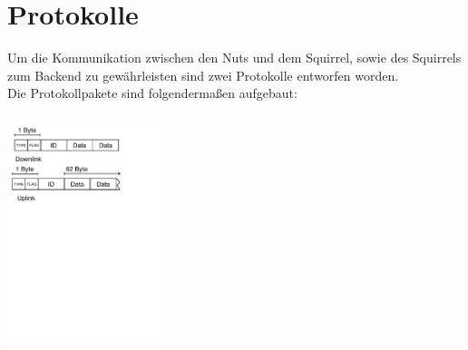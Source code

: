 \documentclass[12pt,a4paper]{article}
\begin{document}
\section{Protokolle}
Um die Kommunikation zwischen den Nuts und dem Squirrel, sowie des Squirrels zum Backend zu gewährleisten sind zwei Protokolle entworfen worden.\\
Die Protokollpakete sind folgendermaßen aufgebaut:
\\
\\
\includegraphics[height=6.5cm]{./ProkollDiagrams.pdf}\\
\end{document}
